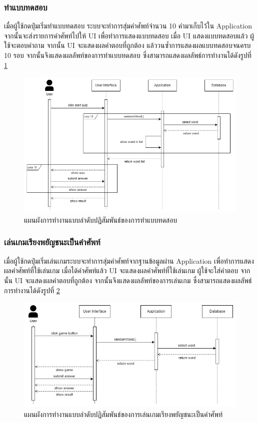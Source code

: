 \documentclass[12pt,oneside,openright,a4paper]{cpe-thai-project}
\begin{document}
\subsubsection{ทำแบบทดสอบ}
\hspace{1cm}
เมื่อผู้ใช้กดปุ่มเริ่มทำแบบทดสอบ ระบบจะทำการสุ่มคำศัพท์จำนวน 10 คำมาเก็บไว้ใน Application จากนั้นจะส่งรายการคำศัพท์ไปให้ UI เพื่อทำการแสดงแบบทดสอบ
เมื่อ UI แสดงแบบทดสอบแล้ว ผู้ใช้จะตอบคำถาม จากนั้น UI จะแสดงผลคำตอบที่ถูกต้อง แล้ววนซ้ำการแสดงผลแบบทดสอบจนครบ 10 รอบ จากนั้นจึงแสดงผลลัพท์ของการทำแบบทดสอบ
ซึ่งสามารถแสดงผลลัพธ์การทำงานได้ดังรูปที่ \ref{fig:S_Quiz}
\begin{figure}[!h]\centering
	\includegraphics[width=\textwidth, keepaspectratio=true]{image/chap3/sequence/Quiz.jpg}
	\caption{แผนผังการทำงานแบบลำดับปฏิสัมพันธ์ของการทำแบบทดสอบ}\label{fig:S_Quiz}
\end{figure}

\pagebreak
\subsubsection{เล่นเกมเรียงพยัญชนะเป็นคำศัพท์}
\hspace{1cm}
เมื่อผู้ใช้กดปุ่มเริ่มเล่นเกมระบบจะทำการสุ่มคำศัพท์จากฐานข้อมูลผ่าน Application เพื่อทำการแสดงผลคำศัพท์ที่ใช้เล่นเกม เมื่อได้คำศัพท์แล้ว
UI จะแสดงผลคำศัพท์ที่ใช้เล่นเกม ผู้ใช้จะใส่คำตอบ จากนั้น UI จะแสดงผลคำตอบที่ถูกต้อง จากนั้นจึงแสดงผลลัพท์ของการเล่นเกม
ซึ่งสามารถแสดงผลลัพธ์การทำงานได้ดังรูปที่ \ref{fig:S_Game}
\begin{figure}[!h]\centering
	\includegraphics[width=\textwidth, keepaspectratio=true]{image/chap3/sequence/Game.jpg}
	\caption{แผนผังการทำงานแบบลำดับปฏิสัมพันธ์ของการเล่นเกมเรียงพยัญชนะเป็นคำศัพท์}\label{fig:S_Game}
\end{figure}
\end{document}
